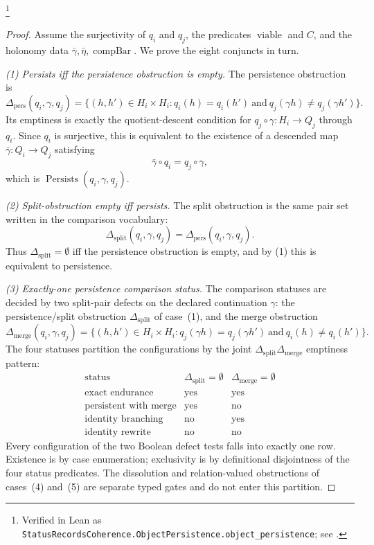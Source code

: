 \footnote{\raggedright Verified in Lean as
\texttt{StatusRecordsCoherence.ObjectPersistence.\allowbreak{}object\_persistence};
see .}
\begin{proof}
Assume the surjectivity of \(q_i\) and \(q_j\), the predicates
\(\operatorname{viable}\) and \(C\), and the holonomy data
\(\bar\gamma,\bar\eta,\operatorname{compBar}\).  We prove the eight
conjuncts in turn.

\emph{(1) Persists iff the persistence obstruction is empty.}
The persistence obstruction is
\[
  \Delta_{\mathrm{pers}}(q_i,\gamma,q_j)
  =
  \{(h,h')\in H_i\times H_i:
      q_i(h)=q_i(h')\ \text{and}\
      q_j(\gamma h)\ne q_j(\gamma h')\}.
\]
Its emptiness is exactly the quotient-descent condition for
\(q_j\circ\gamma:H_i\to Q_j\) through \(q_i\).  Since \(q_i\) is
surjective, this is equivalent to the existence of a descended map
\(\bar\gamma:Q_i\to Q_j\) satisfying
\[
  \bar\gamma\circ q_i=q_j\circ\gamma,
\]
which is \(\operatorname{Persists}(q_i,\gamma,q_j)\).

\emph{(2) Split-obstruction empty iff persists.}
The split obstruction is the same pair set written in the comparison
vocabulary:
\[
  \Delta_{\mathrm{split}}(q_i,\gamma,q_j)
  =
  \Delta_{\mathrm{pers}}(q_i,\gamma,q_j).
\]
Thus \(\Delta_{\mathrm{split}}=\emptyset\) iff the persistence
obstruction is empty, and by (1) this is equivalent to persistence.

\emph{(3) Exactly-one persistence comparison status.}
The comparison statuses are decided by two split-pair defects on the
declared continuation \(\gamma\): the persistence/split obstruction
\(\Delta_{\mathrm{split}}\) of case~(1), and the merge obstruction
\[
  \Delta_{\mathrm{merge}}(q_i,\gamma,q_j)
  =
  \{(h,h')\in H_i\times H_i:
      q_j(\gamma h)=q_j(\gamma h')\ \text{and}\ q_i(h)\ne q_i(h')\}.
\]
The four statuses partition the configurations by the joint
\(\Delta_{\mathrm{split}}\)\textendash{}\(\Delta_{\mathrm{merge}}\)
emptiness pattern:
\[
\begin{array}{c|c|c}
\text{status} & \Delta_{\mathrm{split}}=\emptyset
  & \Delta_{\mathrm{merge}}=\emptyset\\
\hline
\text{exact endurance} & \text{yes} & \text{yes}\\
\text{persistent with merge} & \text{yes} & \text{no}\\
\text{identity branching} & \text{no} & \text{yes}\\
\text{identity rewrite} & \text{no} & \text{no}
\end{array}
\]
Every configuration of the two Boolean defect tests falls into
exactly one row.  Existence is by case enumeration; exclusivity is by
definitional disjointness of the four status predicates.  The
dissolution and relation-valued obstructions of cases~(4) and~(5) are
separate typed gates and do not enter this partition.


\end{proof}
